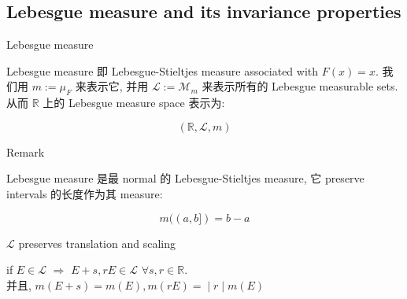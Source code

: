 \documentclass{qlnotes-export}
\begin{document}
\subsection{Lebesgue measure and its invariance properties}\label{lebesgue-measure-and-its-invariance-properties}

\begin{definition}{Lebesgue measure}\label{def-03-distribution-function-lebesgue-stieltjes-measures-lebesgue-measure}

Lebesgue measure 即 Lebesgue-Stieltjes measure associated with \(F(x) = x\). 我们用 \(m := \mu_{F}\) 来表示它, 并用 \(\mathcal{L} := \mathcal{M}_{m}\) 来表示所有的 Lebesgue measurable sets.\\
从而 \(\mathbb{R}\) 上的 Lebesgue measure space 表示为:

\[({\mathbb{R}},\mathcal{L},m)\]

\end{definition}

\begin{qlremark}{Remark}

Lebesgue measure 是最 normal 的 Lebesgue-Stieltjes measure, 它 preserve intervals 的长度作为其 measure:

\[m((a,b\rbrack) = b - a\]

\end{qlremark}

\begin{theorem}{\(\mathcal{L}\) preserves translation and scaling}\label{thm-03-distribution-function-lebesgue-stieltjes-measures-mathcal-l-preserves-translation-and-scaling}

if \(E \in \mathcal{L}\) \(\Rightarrow\) \(E + s,rE \in \mathcal{L}\) \(\forall s,r \in {\mathbb{R}}\).\\
并且, \(\left. m(E + s) = m(E),m(rE) = \middle| r \middle| m(E) \right.\)

\end{theorem}
\end{document}
